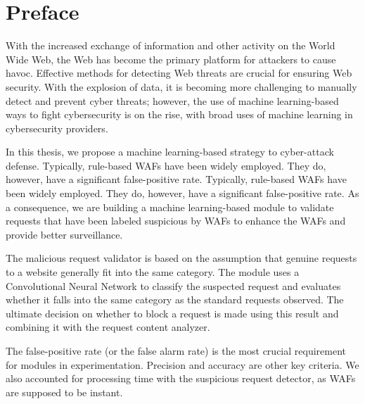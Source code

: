 \chapter*{Preface}
\thispagestyle{fancy}
\label{tom_tat}
\hspace*{5cm}

With the increased exchange of information and other activity on the World Wide Web, the Web has become the primary platform for attackers to cause havoc. Effective methods for detecting Web threats are crucial for ensuring Web security. With the explosion of data, it is becoming more challenging to manually detect and prevent cyber threats; however, the use of machine learning-based ways to fight cybersecurity is on the rise, with broad uses of machine learning in cybersecurity providers. 

In this thesis, we propose a machine learning-based strategy to cyber-attack defense. Typically, rule-based WAFs have been widely employed. They do, however, have a significant false-positive rate. Typically, rule-based WAFs have been widely employed. They do, however, have a significant false-positive rate. As a consequence, we are building a machine learning-based module to validate requests that have been labeled suspicious by WAFs to enhance the WAFs and provide better surveillance. 

The malicious request validator is based on the assumption that genuine requests to a website generally fit into the same category. The module uses a Convolutional Neural Network to classify the suspected request and evaluates whether it falls into the same category as the standard requests observed. The ultimate decision on whether to block a request is made using this result and combining it with the request content analyzer.


The false-positive rate (or the false alarm rate) is the most crucial requirement for modules in experimentation. Precision and accuracy are other key criteria. We also accounted for processing time with the suspicious request detector, as WAFs are supposed to be instant.
	
\cleardoublepage